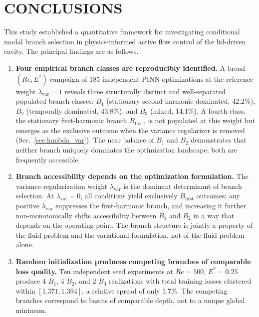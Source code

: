 \documentclass[a4paper,11pt]{article}
\begin{document}
\section{CONCLUSIONS}
\label{sec:conclusions}

This study established a quantitative framework for investigating conditional modal
branch selection in physics-informed active flow control of the lid-driven cavity.
The principal findings are as follows.

\begin{enumerate}
\item \textbf{Four empirical branch classes are reproducibly identified.}
A broad \((Re,E^*)\) campaign of 185 independent PINN optimizations at the
reference weight \(\lambda_{\mathrm{var}}=1\) reveals three structurally distinct and
well-separated populated branch classes: \(B_1\) (stationary
second-harmonic dominated, 42.2\%), \(B_2\) (temporally dominated, 43.8\%), and
\(B_3\) (mixed, 14.1\%). A fourth class, the stationary first-harmonic branch
\(B_{\mathrm{first}}\), is not populated at this weight but emerges as the exclusive
outcome when the variance regularizer is removed (Sec.~\ref{sec:lambda_var}). The
near balance of \(B_1\) and \(B_2\) demonstrates
that neither branch uniquely dominates the optimization landscape; both are
frequently accessible.

\item \textbf{Branch accessibility depends on the optimization formulation.}
The variance-regularization weight \(\lambda_{\mathrm{var}}\) is the dominant
determinant of branch selection. At \(\lambda_{\mathrm{var}}=0\), all conditions
yield exclusively \(B_{\mathrm{first}}\) outcomes; any positive
\(\lambda_{\mathrm{var}}\) suppresses the first-harmonic branch, and increasing it
further non-monotonically shifts accessibility between \(B_1\) and \(B_2\) in a way
that depends on the operating point. The branch structure is jointly a property of
the fluid problem and the variational formulation, not of the fluid problem alone.

\item \textbf{Random initialization produces competing branches of comparable
loss quality.}
Ten independent seed experiments at \(Re=500\), \(E^*=0.25\) produce 4 \(B_1\),
4 \(B_2\), and 2 \(B_3\) realizations with total training losses clustered within
\([1.371,1.394]\), a relative spread of only 1.7\%. The competing branches
correspond to basins of comparable depth, not to a unique global minimum.


\end{enumerate}
\end{document}
